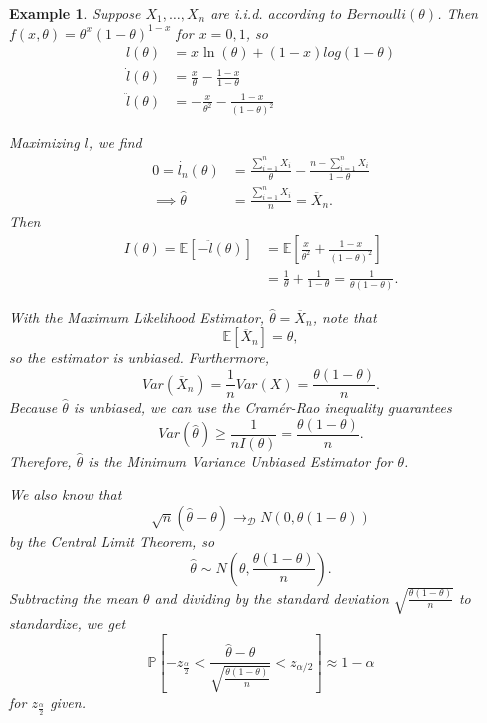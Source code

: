 \documentclass{tufte-handout}
\newcommand*\E{\mathbb{E}}
\renewcommand{\P}{\mathbb{P}}
\newtheorem{ex}[thm]{Example}
\theoremstyle{definition}
\begin{document}
\begin{ex}
	Suppose $X_1,\ldots,X_n$ are i.i.d. according to $Bernoulli(\theta)$. Then $f(x,\theta) = \theta^{x} (1-\theta)^{1-x}$ for $x=0,1$, so
	\begin{align*}
		l(\theta) &= x \ln{(\theta)} + (1-x) log(1-\theta) \\
		\dot{l}(\theta) &= \frac{x}{\theta} -\frac{1-x}{1-\theta} \\
		\ddot{l}(\theta) &= -\frac{x}{\theta^2} - \frac{1-x}{(1-\theta)^2}
	\end{align*}

	Maximizing $l$, we find
	\begin{align*}
		0 = \dot{l_n}(\theta) &= \frac{\sum\limits_{i=1}^{n} X_i}{\theta} - \frac{n-\sum\limits_{i=1}^{n} X_i}{1-\theta} \\
		\implies \hat{\theta} &= \frac{\sum\limits_{i=1}^{n} X_i}{n} = \overline{X}_n
	.\end{align*}
	Then
	\begin{align*}
		I(\theta) = \E\left[-\ddot{l}(\theta)\right] &= \E\left[\frac{x}{\theta^2} + \frac{1-x}{\left( 1-\theta \right)^2}\right] \\
												&= \frac{1}{\theta} + \frac{1}{1-\theta} = \frac{1}{\theta(1-\theta)}
	.\end{align*}

	With the Maximum Likelihood Estimator, $\hat{\theta} = \overline{X}_n$, note that
	 \[
	 	\E\left[\overline{X}_n\right] = \theta
	 ,\] so the estimator is unbiased. Furthermore, \[
	 	Var(\overline{X}_n) = \frac{1}{n} Var(X) = \frac{\theta(1-\theta)}{n}
	 .\] 
	 Because $\hat{\theta}$ is unbiased, we can use the Cram\'er-Rao inequality guarantees \[
		 Var(\hat{\theta}) \ge \frac{1}{n I(\theta)} = \frac{\theta(1-\theta)}{n}
	 .\] 
	 Therefore, $\hat{\theta}$ is the Minimum Variance Unbiased Estimator for $\theta$.	

	 We also know that \[
	 	\sqrt{n} (\hat{\theta} - \theta) \to_{\mathscr{D}} N(0,\theta(1-\theta))
	 \] by the Central Limit Theorem, so \[
	 \hat{\theta} \sim N(\theta, \frac{\theta(1-\theta)}{n})
	 .\] Subtracting the mean $\theta$ and dividing by the standard deviation $\sqrt{\frac{\theta(1-\theta)}{n}} $ to standardize, we get \[
	 \P\left[-z_{\frac{\alpha}{2}} < \frac{\hat{\theta}- \theta}{\sqrt{\frac{\theta(1-\theta)}{n}} } < z_{\alpha/2}\right] \approx 1-\alpha
	 \] for $z_{\frac{\alpha}{2}}$ given.


\end{ex}
\end{document}
